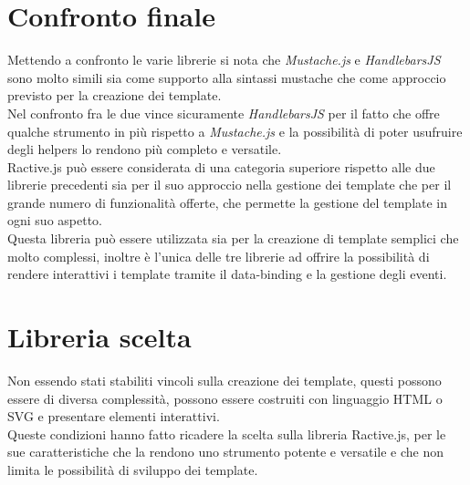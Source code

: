 \section{Confronto finale}
Mettendo a confronto le varie librerie si nota che \textit{Mustache.js} e \textit{HandlebarsJS} sono molto simili sia come supporto alla sintassi mustache che come approccio previsto per la creazione dei template.\\
Nel confronto fra le due vince sicuramente \textit{HandlebarsJS} per il fatto che offre qualche strumento in più rispetto a \textit{Mustache.js} e la possibilità  di poter usufruire degli helpers lo rendono più completo e versatile.\\
Ractive.js può essere considerata di una categoria superiore rispetto alle due librerie precedenti sia per il suo approccio nella gestione dei template che per il grande numero di funzionalità offerte, che permette la gestione del template in ogni suo aspetto.\\
Questa libreria può essere utilizzata sia per la creazione di template semplici che molto complessi, inoltre è l'unica delle tre librerie ad offrire la possibilità di rendere interattivi i template tramite il data-binding e la gestione degli eventi.


\FloatBarrier
\section{Libreria scelta}
Non essendo stati stabiliti vincoli sulla creazione dei template,  questi possono essere di diversa complessità, possono essere costruiti con linguaggio HTML o SVG e presentare elementi interattivi.\\ Queste condizioni hanno fatto ricadere la scelta sulla libreria Ractive.js, per le sue caratteristiche che la rendono uno strumento potente e versatile e che non limita le possibilità di sviluppo dei template.
